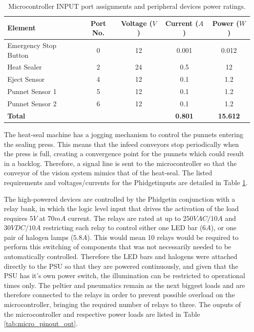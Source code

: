 \documentclass[fleqn,twoside]{article}
\begin{document}
\renewcommand{\arraystretch}{0.8}%
\begin{table}[h]
	\centering
	\caption{Microcontroller INPUT port assignments and peripheral devices power ratings.}
	\label{tab:micro_pinout_in}
	\begin{tabularx}{\linewidth}{Xcccc}
		
		\toprule
		\textbf{Element}  & \textbf{Port No.} & \textbf{Voltage ($V$)} & \textbf{Current ($A$)} & \textbf{Power ($W$)}\\[8pt]
		\midrule
		Emergency Stop Button 	& 0 & 12 & 0.001 & 0.012  \\[4pt]
		\midrule
		Heat Sealer 			& 2 & 24 & 0.5 & 12 \\[4pt]
		\midrule
		Eject Sensor 			& 4 & 12 & 0.1 & 1.2  \\[4pt]
		\midrule
		Punnet Sensor 1 		& 5 & 12 & 0.1 & 1.2 \\[4pt]
		\midrule
		Punnet Sensor 2 		& 6 & 12 & 0.1 & 1.2  \\[4pt]
		\midrule
		\textbf{Total} 			&   &    & \textbf{0.801} & \textbf{15.612} \\[4pt]
		\bottomrule
		
	\end{tabularx}
\end{table}


The heat-seal machine has a jogging mechanism to control the punnets entering the sealing press. This means that the infeed conveyors stop periodically when the press is full, creating a convergence point for the punnets which could result in a backlog. Therefore, a signal line is sent to the microcontroller so that the conveyor of the vision system mimics that of the heat-seal. The listed requirements and voltages/currents for the Phidget\texttrademark inputs are detailed in Table \ref{tab:micro_pinout_in}.

The high-powered devices are controlled by the Phidget\texttrademark in conjunction with a relay bank, in which the logic level input that drives the activation of the load requires $5V$ at $70mA$ current. The relays are rated at up to $250VAC/10A$ and $30VDC/10A$ restricting each relay to control either one LED bar ($6A$), or one pair of halogen lamps ($5.8A$). This would mean 10 relays would be required to perform this switching of components that was not necessarily needed to be automatically controlled. Therefore the LED bars and halogens were attached directly to the PSU so that they are powered continuously, and given that the PSU has it's own power switch, the illumination can be restricted to operational times only. The peltier and pneumatics remain as the next biggest loads and are therefore connected to the relays in order to prevent possible overload on the microcontroller, bringing the required number of relays to three. The ouputs of the microcontroller and respective power loads are listed in Table \ref{tab:micro_pinout_out}.
\end{document}
